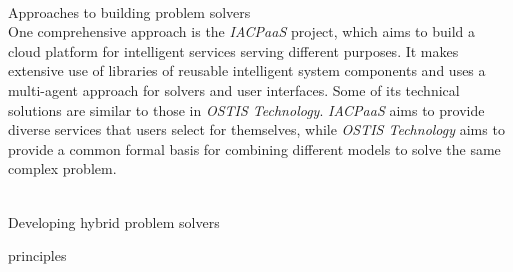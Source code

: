 \begin{frame}{\\Approaches to building problem solvers}
	\topline
	\justifying
	\vspace*{\fill}\\
	\small{
		One comprehensive approach is the \textit{IACPaaS} project, which aims to build a cloud platform for intelligent services serving different purposes. It makes extensive use of libraries of reusable intelligent system components and uses a multi-agent approach for solvers and user interfaces. Some of its technical solutions are similar to those in \textit{OSTIS Technology}. \textit{IACPaaS} aims to provide diverse services that users select for themselves, while \textit{OSTIS Technology} aims to provide a common formal basis for combining different models to solve the same complex problem.
	}
\end{frame}

\begin{frame}{\\Developing hybrid problem solvers}
	\topline
	\justifying
	\setlength{\emergencystretch}{2em}
	\vspace*{\fill}\\
	\footnotesize{
		\begin{SCn}
			\begin{scnrelfromset}{principles}
			\end{scnrelfromset}
		\end{SCn}
	}
\end{frame}

